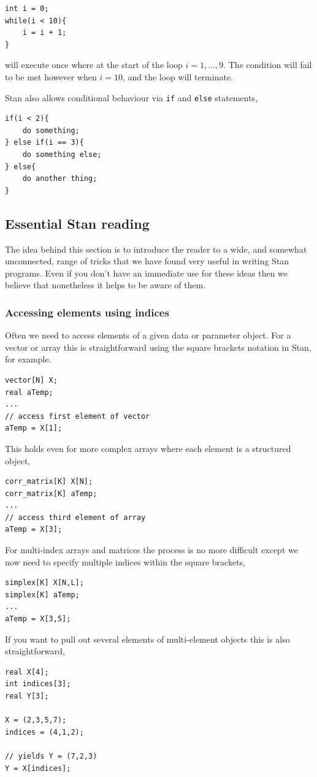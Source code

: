 \documentclass[11pt,fullpage]{book}
\begin{document}
\begin{verbatim}
int i = 0;
while(i < 10){
    i = i + 1;
}
\end{verbatim} 
will execute once where at the start of the loop $i = 1,...,9$. The condition will fail to be met however when $i=10$, and the loop will terminate.

Stan also allows conditional behaviour via \texttt{if} and \texttt{else} statements,
\begin{verbatim}
if(i < 2){
    do something;
} else if(i == 3){
    do something else;
} else{
    do another thing;
}
\end{verbatim}

\subsection{Essential Stan reading}
The idea behind this section is to introduce the reader to a wide, and somewhat unconnected, range of tricks that we have found very useful in writing Stan programs. Even if you don't have an immediate use for these ideas then we believe that nonetheless it helps to be aware of them.

\subsubsection{Accessing elements using indices}
Often we need to access elements of a given data or parameter object. For a vector or array this is straightforward using the square brackets notation in Stan, for example.

\begin{verbatim}
vector[N] X;
real aTemp;
...
// access first element of vector
aTemp = X[1];
\end{verbatim}
This holds even for more complex arrays where each element is a structured object,

\begin{verbatim}
corr_matrix[K] X[N];
corr_matrix[K] aTemp;
...
// access third element of array
aTemp = X[3];
\end{verbatim}
For multi-index arrays and matrices the process is no more difficult except we now need to specify multiple indices within the square brackets,

\begin{verbatim}
simplex[K] X[N,L];
simplex[K] aTemp;
...
aTemp = X[3,5];
\end{verbatim}
If you want to pull out several elements of multi-element objects this is also straightforward,
\begin{verbatim}
real X[4];
int indices[3];
real Y[3];

X = (2,3,5,7);
indices = (4,1,2);

// yields Y = (7,2,3)
Y = X[indices];
\end{verbatim}
\end{document}
